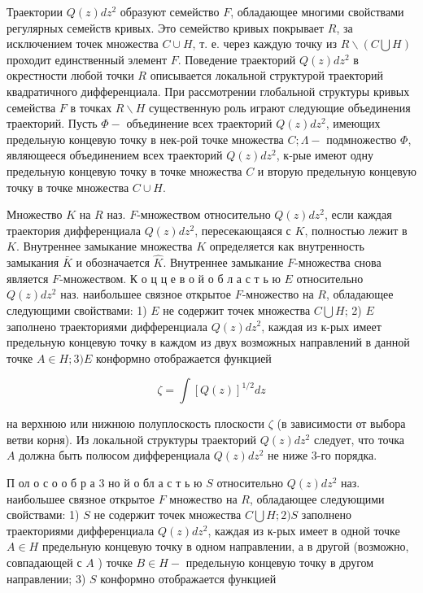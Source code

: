 \documentclass[10pt]{article}
\begin{document}
Траектории $Q(z) d z^{2}$ образуют семейство $F$, обладающее многими свойствами регулярных семейств кривых. Это семейство кривых покрывает $R$, за исключением точек множества $C \cup H$, т. е. через каждую точку из $R \backslash(C \bigcup H)$ проходит единственный элемент $F$. Поведение траекторий $Q(z) d z^{2}$ в окрестности любой точки $R$ описывается локальной структурой траекторий квадратичного дифференциала. При рассмотрении глобальной структуры кривых семейства $F$ в точках $R \backslash H$ существенную роль играют следующие объединения траекторий. Пусть $\Phi-$ объединение всех траекторий $Q(z) d z^{2}$, имеющих предельную концевую точку в нек-рой точке множества $C ; \Lambda-$ подмножество $\Phi$, являющееся объединением всех траекторий $Q(z) d z^{2}$, к-рые имеют одну предельную концевую точку в точке множества $C$ и вторую предельную концевую точку в точке множества $C \cup H$.



Множество $K$ на $R$ наз. $F$-множеством относительно $Q(z) d z^{2}$, если каждая траектория дифференциала $Q(z) d z^{2}$, пересекающаяся с $K$, полностью лежит в $K$. Внутреннее замыкание множества $K$ определяется как внутренность замыкания $\bar{K}$ и обозначается $\widehat{K}$. Внутреннее замыкание $F$-множества снова является $F$-множеством. К о ц ц е в о й о б л а с т ь ю $E$ относительно $Q(z) d z^{2}$ наз. наибольшее связное открытое $F$-множество на $R$, обладающее следующими свойствами: 1) $E$ не содержит точек множества $C \bigcup H$; 2) $E$ заполнено траекториями дифференциала $Q(z) d z^{2}$, каждая из к-рых имеет предельную концевую точку в каждом из двух возможных направлений в данной точке $A \in H ; 3) E$ конформно отображается функцией



\[

\zeta=\int[Q(z)]^{1 / 2} d z

\]



на верхнюю или нижнюю полуплоскость плоскости $\zeta$ (в зависимости от выбора ветви корня). Из локальной структуры траекторий $Q(z) d z^{2}$ следует, что точка $A$ должна быть полюсом дифференциала $Q(z) d z^{2}$ не ниже 3-го порядка.



П ол о с о о б р а 3 но й о бл а с т ь ю $S$ относительно $Q(z) d z^{2}$ наз. наибольшее связное открытое $F$ множество на $R$, обладающее следующими свойствами: 1) $S$ не содержит точек множества $C \bigcup H ; 2) S$ заполнено траекториями дифференциала $Q(z) d z^{2}$, каждая из к-рых имеет в одной точке $A \in H$ предельную концевую точку в одном направлении, а в другой (возможно, совпадающей с $A$ ) точке $B \in H-$ предельную концевую точку в другом направлении; 3) $S$ конформно отображается функцией
\end{document}
